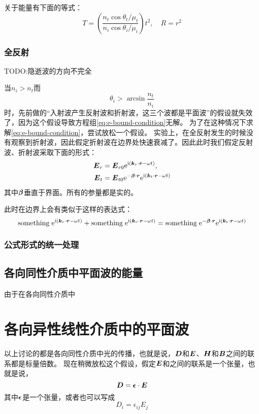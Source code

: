 \documentclass[UTF8, a4paper]{ctexart}
\newcommand*{\ii}{\mathrm{i}}
\newcommand*{\ee}{\mathrm{e}}
\begin{document}
关于能量有下面的等式：
\begin{equation}
    T = \left( \frac{n_t \cos \theta_t / \mu_t}{n_i \cos \theta_i / \mu_i} \right) t^2, \quad R = r^2
\end{equation}

\subsubsection{全反射}\label{sec:total-reflect}

TODO:隐逝波的方向不完全

当$n_i > n_t$而
\[
    \theta_i > \arcsin \frac{n_t}{n_i}
\]
时，先前做的“入射波产生反射波和折射波，这三个波都是平面波”的假设就失效了，因为这个假设导致方程组\eqref{eq:e-bound-condition}无解。
为了在这种情况下求解\eqref{eq:e-bound-condition}，尝试放松一个假设。
实验上，在全反射发生的时候没有观察到折射波，因此假定折射波在边界处快速衰减了。因此此时我们假定反射波、折射波采取下面的形式：
\[
    \begin{aligned}
        \vb*{E}_r &= \vb*{E}_{r0} \ee^{\ii (\vb*{k}_r \cdot \vb*{r} - \omega t)}, \\
        \vb*{E}_t &= \vb*{E}_{t0} \ee^{-\vb*{\beta} \cdot \vb*{r}} \ee^{\ii (\vb*{k}_t \cdot \vb*{r} - \omega t)}
    \end{aligned}
\]
其中$\vb*{\beta}$垂直于界面。所有的参量都是实的。

此时在边界上会有类似于这样的表达式：
\[
    \mathrm{something} \; \ee^{\ii (\vb*{k}_r \cdot \vb*{r} - \omega t)} + \mathrm{something} \; \ee^{\ii (\vb*{k}_r \cdot \vb*{r} - \omega t)} = \mathrm{something} \; \ee^{-\vb*{\beta} \cdot \vb*{r}} \ee^{\ii (\vb*{k}_t \cdot \vb*{r} - \omega t)}
\]

\subsubsection{公式形式的统一处理}

\subsection{各向同性介质中平面波的能量}

由于在各向同性介质中

\section{各向异性线性介质中的平面波}

以上讨论的都是各向同性介质中光的传播，也就是说，$\vb*{D}$和$\vb*{E}$、$\vb*{H}$和$\vb*{B}$之间的联系都是标量倍数。
现在稍微放松这个假设，假定$\vb*{E}$和之间的联系是一个张量，也就是说，
\[
    \vb*{D} = \vb*{\epsilon} \cdot \vb*{E}
\]
其中$\vb*{\epsilon}$是一个张量，或者也可以写成
\[
    D_i = \epsilon_{ij} E_j
\]
\end{document}
